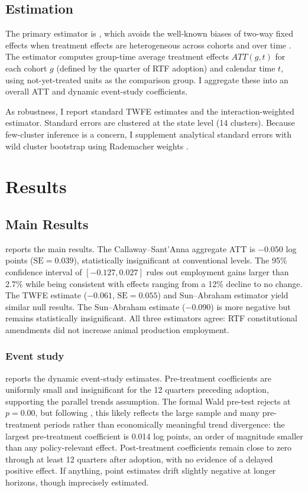 \documentclass[12pt]{article}
\begin{document}
\subsection{Estimation}

The primary estimator is \citet{callaway2021}, which avoids the well-known biases of two-way fixed effects when treatment effects are heterogeneous across cohorts and over time \citep{goodmanbacon2021, dechaisemartin2020}. The estimator computes group-time average treatment effects $ATT(g,t)$ for each cohort $g$ (defined by the quarter of RTF adoption) and calendar time $t$, using not-yet-treated units as the comparison group. I aggregate these into an overall ATT and dynamic event-study coefficients.

As robustness, I report standard TWFE estimates and the \citet{sunab2021} interaction-weighted estimator. Standard errors are clustered at the state level (14 clusters). Because few-cluster inference is a concern, I supplement analytical standard errors with wild cluster bootstrap using Rademacher weights \citep{roth2022}.


\section{Results}
\label{sec:results}

\subsection{Main Results}

 reports the main results. The Callaway--Sant'Anna aggregate ATT is $-0.050$ log points ($\text{SE} = 0.039$), statistically insignificant at conventional levels. The 95\% confidence interval of $[-0.127, 0.027]$ rules out employment gains larger than 2.7\% while being consistent with effects ranging from a 12\% decline to no change. The TWFE estimate ($-0.061$, $\text{SE} = 0.055$) and Sun--Abraham estimator yield similar null results. The Sun--Abraham estimate ($-0.090$) is more negative but remains statistically insignificant. All three estimators agree: RTF constitutional amendments did not increase animal production employment.



\subsubsection*{Event study}  reports the dynamic event-study estimates. Pre-treatment coefficients are uniformly small and insignificant for the 12 quarters preceding adoption, supporting the parallel trends assumption. The formal Wald pre-test rejects at $p = 0.00$, but following \citet{roth2022}, this likely reflects the large sample and many pre-treatment periods rather than economically meaningful trend divergence: the largest pre-treatment coefficient is 0.014 log points, an order of magnitude smaller than any policy-relevant effect. Post-treatment coefficients remain close to zero through at least 12 quarters after adoption, with no evidence of a delayed positive effect. If anything, point estimates drift slightly negative at longer horizons, though imprecisely estimated.
\end{document}
